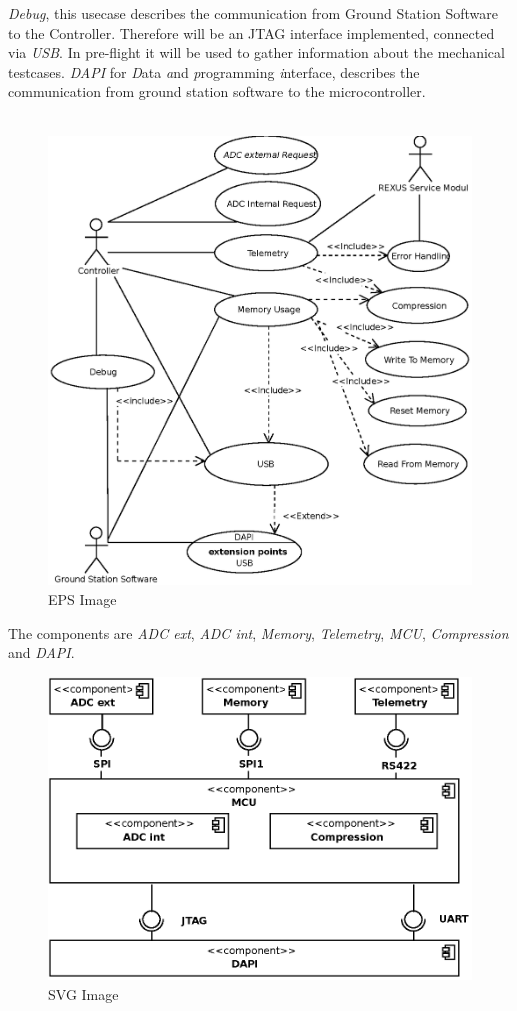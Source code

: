 \textit{Debug}, this usecase describes the communication from Ground Station Software to the Controller. Therefore will be an JTAG interface implemented, connected via \textit{USB}. In pre-flight it will be used to gather information about the mechanical testcases.
\textit{DAPI} for \textit{D}ata \textit{a}nd \textit{p}rogramming  \textit{i}nterface, describes the communication from ground station software to the microcontroller. \\ \\
\begin{figure}[!h]
	\centering
	  \includegraphics{HERMESS_USECASE.eps}
	\caption{EPS Image}
\end{figure}
The components are \textit{ADC ext}, \textit{ADC int}, \textit{Memory}, \textit{Telemetry}, \textit{MCU}, \textit{Compression} and \textit{DAPI}.      
\begin{figure}[h]
	\centering
	\includegraphics{Components.eps}
	\caption{SVG Image}
\end{figure}
